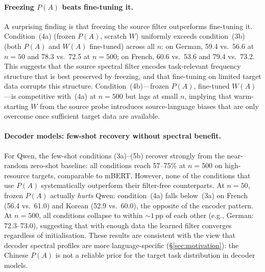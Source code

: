 \paragraph{Freezing $P(A)$ beats fine-tuning it.}
A surprising finding is that freezing the source filter outperforms
fine-tuning it.
Condition~(4a) (frozen $P(A)$, scratch $W$) uniformly exceeds
condition~(3b) (both $P(A)$ and $W(A)$ fine-tuned) across all $n$:
on German, 59.4 vs.\ 56.6 at $n{=}50$ and 78.3 vs.\ 72.5 at
$n{=}500$; on French, 60.6 vs.\ 53.6 and 79.4 vs.\ 73.2.
This suggests that the source spectral filter encodes task-relevant
frequency structure that is best preserved by freezing, and that
fine-tuning on limited target data corrupts this structure.
Condition~(4b)---frozen $P(A)$, fine-tuned $W(A)$---is
competitive with~(4a) at $n{=}500$ but lags at small $n$, implying
that warm-starting $W$ from the source probe introduces source-language
biases that are only overcome once sufficient target data are available.

\paragraph{Decoder models: few-shot recovery without spectral benefit.}
For Qwen, the few-shot conditions (3a)--(5b) recover strongly from
the near-random zero-shot baseline: all conditions reach 57--75\%
at $n{=}500$ on high-resource targets, comparable to mBERT.
However, none of the conditions that use $P(A)$ systematically
outperform their filter-free counterparts.
At $n{=}50$, frozen $P(A)$ actually \emph{hurts} Qwen: condition~(4a)
falls below~(3a) on French (56.4 vs.\ 61.0) and Korean (52.9
vs.\ 60.0), the opposite of the encoder pattern.
At $n{=}500$, all conditions collapse to within ${\sim}1$\,pp of
each other (e.g., German: 72.3--73.0), suggesting that with enough
data the learned filter converges regardless of initialisation.
These results are consistent with the view that decoder spectral
profiles are more language-specific (§\ref{sec:motivation}): the
Chinese $P(A)$ is not a reliable prior for the target task
distribution in decoder models.
